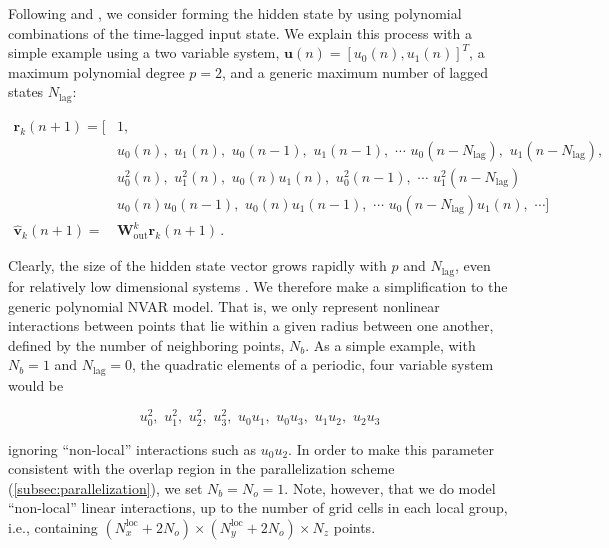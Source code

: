 \documentclass[draft]{agujournal2019}
\newcommand{\state}{\mathbf{v}}
\newcommand{\hidden}{\mathbf{r}}
\newcommand{\inputstate}{\mathbf{u}}
\newcommand{\Wout}{\mathbf{W}_\text{out}}
\newcommand{\localWout}{\Wout^{k}}
\newcommand{\maxpolynomial}{p}
\newcommand{\maxlag}{N_\text{lag}}
\newcommand{\localhidden}{\hidden_{k}}
\newcommand{\localoutput}{\hat{\state}_{k}}
\newcommand{\nx}{N_{x}}
\newcommand{\ny}{N_{y}}
\newcommand{\nvertical}{N_{z}}
\newcommand{\noverlap}{N_{o}}
\newcommand{\nlocalx}{\nx^\text{loc}}
\newcommand{\nlocaly}{\ny^\text{loc}}
\newcommand{\nneighbor}{N_{b}}
\newcommand{\nlag}{\maxlag}
\newcommand{\citep}{\cite}
\newcommand{\citet}{\citeA}
\begin{document}
Following \citet{gauthier_next_2021} and \citet{chen_next_2022}, we consider forming the hidden state by using polynomial combinations of the time-lagged input state.
We explain this process with a simple example using a two variable system,
$\inputstate(n) = [u_0(n), u_1(n)]^T$,
a maximum polynomial degree
$\maxpolynomial=2$, and a generic maximum number of lagged states $\maxlag$:
\begin{linenomath*}\begin{equation}
    \begin{aligned}
        \localhidden(n+1)
        =
        [&1, \\
         &u_0(n), \,\, u_1(n), \,\,
        u_0(n-1),\,\, u_1(n-1), \,\,
        \cdots \,\,
        u_0(n-\maxlag), \,\, u_1(n-\maxlag), \\
         &u_0^2(n), \,\, u_1^2(n), \,\, u_0(n)u_1(n), \,\,
        u_0^2(n-1), \,\, \cdots \,\, u_1^2(n-\nlag) \\
         &u_0(n)u_0(n-1), \,\,
        u_0(n)u_1(n-1), \,\, \cdots \,\, u_0(n-\nlag)u_1(n), \,\,\cdots
        ] \\
        \localoutput(n+1) = &\localWout \localhidden(n+1) \, .
    \end{aligned}
\end{equation}\end{linenomath*}
Clearly, the size of the hidden state vector grows rapidly with
$\maxpolynomial$ and $\nlag$,
even for relatively low dimensional systems
\citep<see supplemental material of>[for explicit calculations]{chen_next_2022}.
We therefore make a simplification to the generic polynomial NVAR model.
That is, we only represent nonlinear interactions between points that lie
within a given radius between one another, defined by the number of neighboring
points, $\nneighbor$.
As a simple example, with $\nneighbor=1$ and $\maxlag=0$, the quadratic elements of a periodic, four variable
system would be
\begin{linenomath*}\begin{equation*}
    u_0^2, \,\, u_1^2, \,\, u_2^2, \,\, u_3^2, \,\,
    u_0u_1, \,\, u_0u_3, \,\, u_1u_2, \,\, u_2u_3
\end{equation*}\end{linenomath*}
ignoring ``non-local'' interactions such as $u_0u_2$.
In order to make this parameter consistent with the overlap region in the parallelization scheme (\cref{subsec:parallelization}),
we set $\nneighbor = \noverlap = 1$.
Note, however, that we do model ``non-local'' linear interactions, up to the
number of grid cells in each local group, i.e., containing
$(\nlocalx+2\noverlap)\times(\nlocaly+2\noverlap)\times\nvertical$ points.
\end{document}

